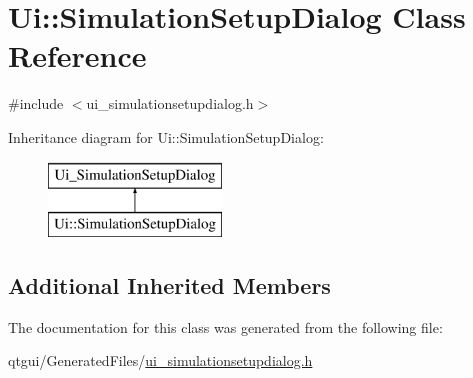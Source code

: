 \hypertarget{class_ui_1_1_simulation_setup_dialog}{}\section{Ui\+::Simulation\+Setup\+Dialog Class Reference}
\label{class_ui_1_1_simulation_setup_dialog}


{\ttfamily \#include $<$ui\+\_\+simulationsetupdialog.\+h$>$}

Inheritance diagram for Ui\+::Simulation\+Setup\+Dialog\+:\begin{figure}[H]
\begin{center}
\leavevmode
\includegraphics[height=2.000000cm]{d7/d35/class_ui_1_1_simulation_setup_dialog}
\end{center}
\end{figure}
\subsection*{Additional Inherited Members}


The documentation for this class was generated from the following file\+:\begin{DoxyCompactItemize}
\item 
qtgui/\+Generated\+Files/\mbox{\hyperlink{ui__simulationsetupdialog_8h}{ui\+\_\+simulationsetupdialog.\+h}}\end{DoxyCompactItemize}
